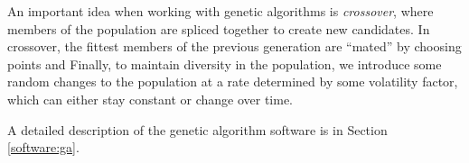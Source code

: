An important idea when working with genetic algorithms is \textit{crossover}, where members of the population are spliced together to create new candidates.
In crossover, the fittest members of the previous generation are ``mated'' by choosing points and 
Finally, to maintain diversity in the population, we introduce some random changes to the population at a rate determined by some volatility factor, which can either stay constant or change over time.



A detailed description of the genetic algorithm software is in Section \ref{software:ga}.